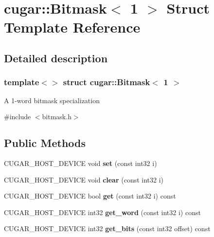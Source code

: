 \hypertarget{structcugar_1_1_bitmask_3_011_01_4}{}\section{cugar\+:\+:Bitmask$<$ 1 $>$ Struct Template Reference}
\label{structcugar_1_1_bitmask_3_011_01_4}


\subsection{Detailed description}
\subsubsection*{template$<$$>$\newline
struct cugar\+::\+Bitmask$<$ 1 $>$}

A 1-\/word bitmask specialization 

{\ttfamily \#include $<$bitmask.\+h$>$}

\subsection*{Public Methods}
\begin{DoxyCompactItemize}
\item 
\mbox{\label{structcugar_1_1_bitmask_3_011_01_4_af75b1d69928587f1c8890944787afd57}} 
C\+U\+G\+A\+R\+\_\+\+H\+O\+S\+T\+\_\+\+D\+E\+V\+I\+CE void {\bfseries set} (const int32 i)
\item 
\mbox{\label{structcugar_1_1_bitmask_3_011_01_4_a58775380b9e011ed141296db2f6c0bac}} 
C\+U\+G\+A\+R\+\_\+\+H\+O\+S\+T\+\_\+\+D\+E\+V\+I\+CE void {\bfseries clear} (const int32 i)
\item 
\mbox{\label{structcugar_1_1_bitmask_3_011_01_4_a85017cfd954235ae1befd699f9427f10}} 
C\+U\+G\+A\+R\+\_\+\+H\+O\+S\+T\+\_\+\+D\+E\+V\+I\+CE bool {\bfseries get} (const int32 i) const
\item 
\mbox{\label{structcugar_1_1_bitmask_3_011_01_4_aea97056067326f4eb7c2a4ab7d85f689}} 
C\+U\+G\+A\+R\+\_\+\+H\+O\+S\+T\+\_\+\+D\+E\+V\+I\+CE int32 {\bfseries get\+\_\+word} (const int32 i) const
\item 
\mbox{\label{structcugar_1_1_bitmask_3_011_01_4_a8f8c9256ce52f7d160027eaaec3ee679}} 
C\+U\+G\+A\+R\+\_\+\+H\+O\+S\+T\+\_\+\+D\+E\+V\+I\+CE int32 {\bfseries get\+\_\+bits} (const int32 offset) const
\end{DoxyCompactItemize}
